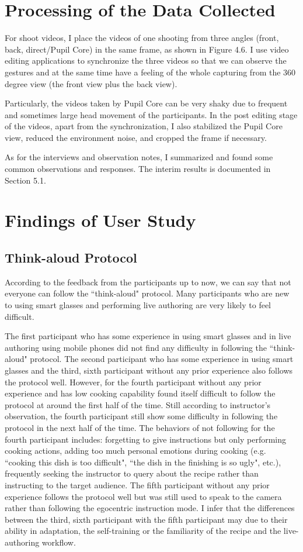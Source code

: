 \documentclass[fyp]{socreport}
\begin{document}
\section{Processing of the Data Collected}
For shoot videos, I place the videos of one shooting from three angles (front, back, direct/Pupil Core) in the same frame, as shown in Figure 4.6. I use video editing applications to synchronize the three videos so that we can observe the gestures and at the same time have a feeling of the whole capturing from the 360 degree view (the front view plus the back view).

Particularly, the videos taken by Pupil Core can be very shaky due to frequent and sometimes large head movement of the participants. In the post editing stage of the videos, apart from the synchronization, I also stabilized the Pupil Core view, reduced the environment noise, and cropped the frame if necessary.

As for the interviews and observation notes, I summarized and found some common observations and responses. The interim results is documented in Section 5.1.

\section{Findings of User Study}
\subsection{Think-aloud Protocol}
According to the feedback from the participants up to now, we can say that not everyone can follow the ``think-aloud" protocol. Many participants who are new to using smart glasses and performing live authoring are very likely to feel difficult. 

The first participant who has some experience in using smart glasses and in live authoring using mobile phones did not find any difficulty in following the ``think-aloud" protocol. The second participant who has some experience in using smart glasses and the third, sixth participant without any prior experience also follows the protocol well. However, for the fourth participant without any prior experience and has low cooking capability found itself difficult to follow the protocol at around the first half of the time. Still according to instructor's observation, the fourth participant still show some difficulty in following the protocol in the next half of the time. The behaviors of not following for the fourth participant includes: forgetting to give instructions but only performing cooking actions, adding too much personal emotions during cooking (e.g. ``cooking this dish is too difficult", ``the dish in the finishing is so ugly", etc.), frequently seeking the instructor to query about the recipe rather than instructing to the target audience. The fifth participant without any prior experience follows the protocol well but was still used to speak to the camera rather than following the egocentric instruction mode. I infer that the differences between the third, sixth participant with the fifth participant may due to their ability in adaptation, the self-training or the familiarity of the recipe and the live-authoring workflow.
\end{document}
